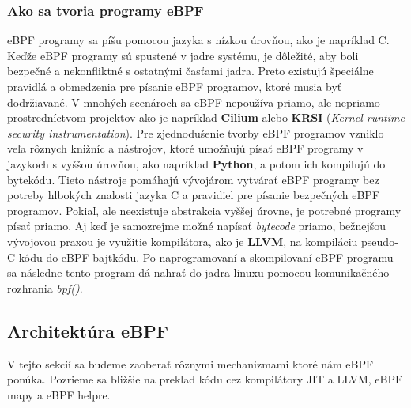 \subsubsection{Ako sa tvoria programy eBPF}
eBPF programy sa píšu pomocou jazyka s nízkou úrovňou, ako je napríklad C. Keďže eBPF programy sú spustené v jadre systému, je dôležité, 
aby boli bezpečné a nekonfliktné s ostatnými časťami jadra. Preto existujú špeciálne pravidlá a obmedzenia pre písanie eBPF programov, 
ktoré musia byť dodržiavané. V mnohých scenároch sa eBPF nepoužíva priamo, ale nepriamo prostredníctvom projektov ako je napríklad 
\textbf{Cilium} alebo \textbf{KRSI} (\emph{Kernel runtime security instrumentation}). Pre zjednodušenie tvorby eBPF programov vzniklo veľa rôznych 
knižníc a nástrojov, ktoré umožňujú písať eBPF programy v jazykoch s vyššou úrovňou, ako napríklad \textbf{Python}, a potom ich kompilujú do bytekódu. 
Tieto nástroje pomáhajú vývojárom vytvárať eBPF programy bez potreby hlbokých znalosti jazyka C a pravidiel pre písanie bezpečných eBPF programov. 
Pokiaľ, ale neexistuje abstrakcia vyššej úrovne, je potrebné programy písať priamo. Aj keď je samozrejme možné napísať \emph{bytecode} priamo, 
bežnejšou vývojovou praxou je využitie kompilátora, ako je \textbf{LLVM}, na kompiláciu pseudo-C kódu do eBPF bajtkódu. 
Po naprogramovaní a skompilovaní eBPF programu sa následne tento program dá nahrať do jadra linuxu pomocou komunikačného rozhrania \emph{bpf()}.~\cite{eBPF}
\pagebreak

\subsection{Architektúra eBPF}
\label{sec:architecture}
V tejto sekcií sa budeme zaoberať rôznymi mechanizmami ktoré nám eBPF ponúka. Pozrieme sa bližšie na preklad kódu cez 
kompilátory JIT a LLVM, eBPF mapy a eBPF helpre. 

